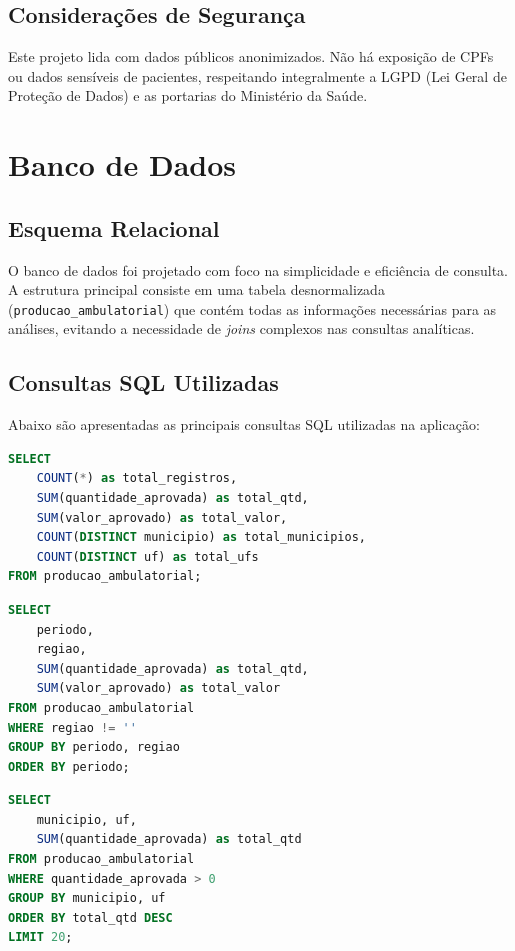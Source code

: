 \documentclass[
    12pt,
    oneside,
    a4paper,
    chapter=TITLE,
    section=TITLE
]{abntex2}
\begin{document}
\section{Considerações de Segurança}
Este projeto lida com dados públicos anonimizados. Não há exposição de CPFs ou dados sensíveis de pacientes, respeitando integralmente a LGPD (Lei Geral de Proteção de Dados) e as portarias do Ministério da Saúde.


\chapter{Banco de Dados}

\section{Esquema Relacional}

O banco de dados foi projetado com foco na simplicidade e eficiência de consulta. A estrutura principal consiste em uma tabela desnormalizada (\texttt{producao\_ambulatorial}) que contém todas as informações necessárias para as análises, evitando a necessidade de \textit{joins} complexos nas consultas analíticas.

\section{Consultas SQL Utilizadas}

Abaixo são apresentadas as principais consultas SQL utilizadas na aplicação:

\begin{lstlisting}[language=SQL,caption={Consulta de KPIs principais}]
SELECT
    COUNT(*) as total_registros,
    SUM(quantidade_aprovada) as total_qtd,
    SUM(valor_aprovado) as total_valor,
    COUNT(DISTINCT municipio) as total_municipios,
    COUNT(DISTINCT uf) as total_ufs
FROM producao_ambulatorial;
\end{lstlisting}

\begin{lstlisting}[language=SQL,caption={Consulta de evolução temporal por região}]
SELECT
    periodo,
    regiao,
    SUM(quantidade_aprovada) as total_qtd,
    SUM(valor_aprovado) as total_valor
FROM producao_ambulatorial
WHERE regiao != ''
GROUP BY periodo, regiao
ORDER BY periodo;
\end{lstlisting}

\begin{lstlisting}[language=SQL,caption={Top 20 municípios}]
SELECT
    municipio, uf,
    SUM(quantidade_aprovada) as total_qtd
FROM producao_ambulatorial
WHERE quantidade_aprovada > 0
GROUP BY municipio, uf
ORDER BY total_qtd DESC
LIMIT 20;
\end{lstlisting}
\end{document}

